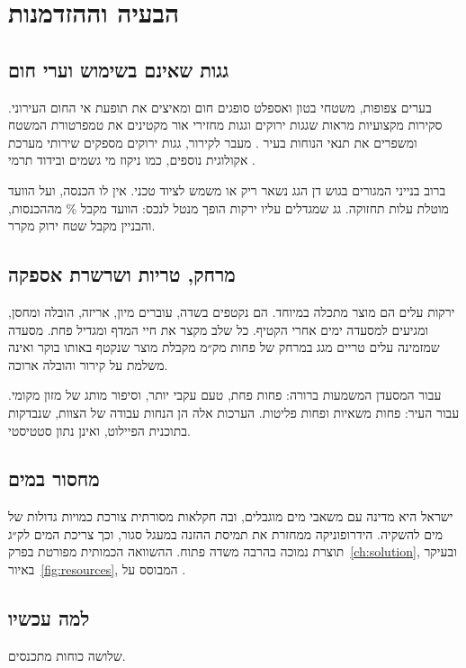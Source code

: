 \chapter{הבעיה וההזדמנות}\label{ch:problem}

\section{גגות שאינם בשימוש וערי חום}
בערים צפופות, משטחי בטון ואספלט סופגים חום ומאיצים את תופעת אי החום העירוני. סקירות מקצועיות מראות שגגות ירוקים וגגות מחזירי אור מקטינים את טמפרטורת המשטח ומשפרים את תנאי הנוחות בעיר \cite{santamouris2014}. מעבר לקירור, גגות ירוקים מספקים שירותי מערכת אקולוגית נוספים, כמו ניקוז מי גשמים ובידוד תרמי \cite{oberndorfer2007}.

ברוב בנייני המגורים בגוש דן הגג נשאר ריק או משמש לציוד טכני. אין לו הכנסה, ועל הוועד מוטלת עלות תחזוקה. גג שמגדלים עליו ירקות הופך מנטל לנכס: הוועד מקבל \RRrentShare\% מההכנסות, והבניין מקבל שטח ירוק מקרר.

\section{מרחק, טריות ושרשרת אספקה}
ירקות עלים הם מוצר מתכלה במיוחד. הם נקטפים בשדה, עוברים מיון, אריזה, הובלה ומחסן, ומגיעים למסעדה ימים אחרי הקטיף. כל שלב מקצר את חיי המדף ומגדיל פחת. מסעדה שמזמינה עלים טריים מגג במרחק של פחות מק״מ מקבלת מוצר שנקטף באותו בוקר ואינה משלמת על קירור והובלה ארוכה.

עבור המסעדן המשמעות ברורה: פחות פחת, טעם עקבי יותר, וסיפור מותג של מזון מקומי. עבור העיר: פחות משאיות ופחות פליטות. הערכות אלה הן הנחות עבודה של הצוות, שנבדקות בתוכנית הפיילוט, ואינן נתון סטטיסטי.

\section{מחסור במים}
ישראל היא מדינה עם משאבי מים מוגבלים, ובה חקלאות מסורתית צורכת כמויות גדולות של מים להשקיה. הידרופוניקה ממחזרת את תמיסת ההזנה במעגל סגור, וכך צריכת המים לק״ג תוצרת נמוכה בהרבה משדה פתוח. ההשוואה הכמותית מפורטת בפרק~\ref{ch:solution}, ובעיקר באיור~\ref{fig:resources}, המבוסס על \cite{barbosa2015}.

\section{למה עכשיו}
שלושה כוחות מתכנסים.

